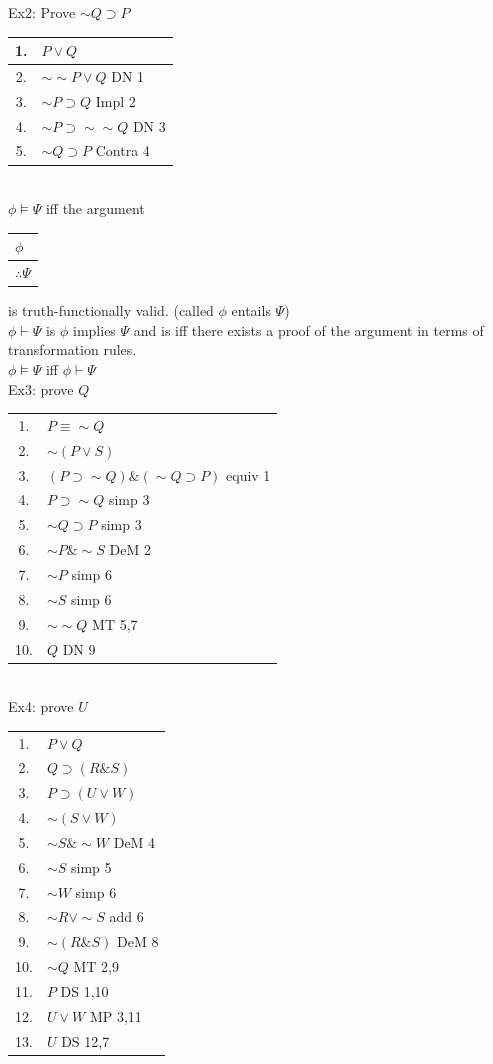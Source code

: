 \documentclass[11pt, fleqn]{article}
\newcommand{\argument}[2]{\begin{tabular}{p{#1 cm}} #2 \end{tabular}}
\begin{document}
Ex2: Prove $\sim Q\supset P$\\
\begin{tabular}{cl}
    1. & $P\vee Q$\\
    \hline
    2. & $\sim\sim P\vee Q$ DN 1\\
    3. & $\sim P\supset Q$ Impl 2\\
    4. & $\sim P\supset \sim\sim Q$ DN 3\\
    5. & $\sim Q\supset P$ Contra 4
\end{tabular}\\
$\phi \vDash\Psi$ iff the argument \argument{0.7}{$\phi$\\ \hline $\therefore \Psi$} is truth-functionally valid. (called $\phi$ entails $\Psi$)\\
$\phi\vdash\Psi$ is $\phi$ implies $\Psi$ and is iff there exists a proof of the argument in terms of transformation rules.\\
$\phi\vDash\Psi$ iff $\phi\vdash\Psi$\\
Ex3: prove $Q$\\
\begin{tabular}{cl}
    1. & $P\equiv \sim Q$\\
    2. & $\sim(P\vee S)$\\
    \hline
    3. & $(P\supset\sim Q)\&(\sim Q\supset P)$ equiv 1\\
    4. & $P\supset \sim Q$ simp 3\\
    5. & $\sim Q\supset P$ simp 3\\
    6. & $\sim P\&\sim S$ DeM 2\\
    7. & $\sim P$ simp 6\\
    8. & $\sim S$ simp 6\\
    9. & $\sim \sim Q$ MT 5,7\\
    10. & $Q$ DN 9
\end{tabular}\\
Ex4: prove $U$\\
\begin{tabular}{cl}
    1. & $P\vee Q$\\
    2. & $Q\supset(R\& S)$\\
    3. & $P\supset(U\vee W)$\\
    4. & $\sim(S\vee W)$\\
    \hline
    5. & $\sim S\&\sim W$ DeM 4\\
    6. & $\sim S$ simp 5\\
    7. & $\sim W$ simp 6\\
    8. & $\sim R\vee \sim S$ add 6\\
    9. & $\sim(R\& S)$ DeM 8\\
    10. & $\sim Q$ MT 2,9\\
    11. & $P$ DS 1,10\\
    12. & $U\vee W$ MP 3,11\\
    13. & $U$ DS 12,7
\end{tabular}
\end{document}
